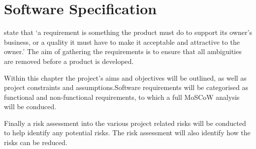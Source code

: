 \chapter{Software Specification} 
\label{chap:requirements} 

\citet{robertson13} state that `a requirement is something the product must 
do to support its owner's business, or a quality it must have to make it 
acceptable and attractive to the owner.' The aim of gathering the requirements 
is to ensure that all ambiguities are removed before a product is developed.

Within this chapter the project's aims and objectives will be outlined, as well 
as project constraints and assumptions.Software requirements will be categorised
as functional and non-functional requirements, to which a full MoSCoW analysis 
will be conduced.

Finally a risk assessment into the various project related risks will be 
conducted to help identify any potential risks. The risk assessment will also 
identify how the risks can be reduced.


\newpage


\newpage


\newpage


\newpage


\newpage


\newpage


\newpage 


\newpage


